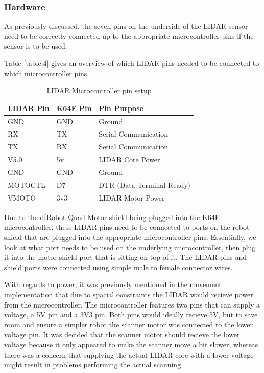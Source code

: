 				\subsubsection{Hardware}
				As previously discussed, the seven pins on the underside of the LIDAR sensor need to be correctly connected up to the appropriate microcontroller pins if the sensor is to be used.
				
				Table \ref{table:4} gives an overview of which LIDAR pins needed to be connected to which microcontroller pins.
				
				\begin{table}[h!]
					\centering
					\begin{tabular}{|| l | l | l ||} 
						\hline
						LIDAR Pin & K64F Pin & Pin Purpose \\ [0.5ex] 
						\hline
						GND  & GND & Ground  \\ 
						RX  & TX  & Serial Communication \\
						TX  & RX & Serial Communication \\
						V5.0 & 5v & LIDAR Core Power \\ 
						GND & GND & Ground \\ 
						MOTOCTL & D7 & DTR (Data Terminal Ready) \\ 
						VMOTO & 3v3 & LIDAR Motor Power \\ [1ex] 
						\hline
					\end{tabular}
					\caption{LIDAR Microcontroller pin setup}
					\label{table:3}
				\end{table}
			
				Due to the dfRobot Quad Motor shield being plugged into the K64F microcontroller, these LIDAR pins need to be connected to ports on the robot shield that are plugged into the appropriate microcontroller pins. Essentially, we look at what port needs to be used on the underlying microcontroller, then plug it into the motor shield port that is sitting on top of it. The LIDAR pins and shield ports were connected using simple male to female connector wires.
				
				With regards to power, it was previously mentioned in the movement implementation that due to spacial constraints the LIDAR would recieve power from the microcontroller. The microcontroller features two pins that can supply a voltage, a 5V pin and a 3V3 pin. Both pins would ideally recieve 5V, but to save room and ensure a simpler robot the scanner motor was connected to the lower voltage pin. It was decided that the scanner motor should recieve the lower voltage because it only appeared to make the scanner move a bit slower, whereas there was a concern that supplying the actual LIDAR core with a lower voltage might result in problems performing the actual scanning. 
				

